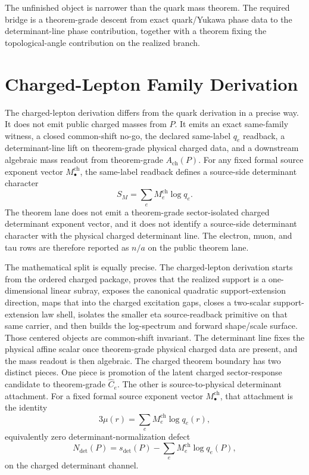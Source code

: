 \documentclass[11pt]{article}
\begin{document}
The unfinished object is narrower than the quark mass theorem. The required bridge is a
theorem-grade descent from exact quark/Yukawa phase data to the determinant-line phase
contribution, together with a theorem fixing the topological-angle contribution on the realized
branch.

\section{Charged-Lepton Family Derivation}

The charged-lepton derivation differs from the quark derivation in a precise way. It does not emit public charged masses from \(P\). It emits an exact same-family witness, a closed common-shift no-go, the declared same-label \(q_e\) readback, a determinant-line lift on theorem-grade physical charged data, and a downstream algebraic mass readout from theorem-grade \(A_{\mathrm{ch}}(P)\). For any fixed formal source exponent vector \(M_\bullet^{\mathrm{ch}}\), the same-label readback defines a source-side determinant character
\[
S_M=\sum_e M_e^{\mathrm{ch}}\log q_e.
\]
The theorem lane does not emit a theorem-grade sector-isolated charged determinant exponent vector, and it does not identify a source-side determinant character with the physical charged determinant line. The electron, muon, and tau rows are therefore reported as \(n/a\) on the public theorem lane.

The mathematical split is equally precise. The charged-lepton derivation starts from
the ordered charged package, proves that the realized support is a one-dimensional linear subray,
exposes the canonical quadratic support-extension direction, maps that into the charged
excitation gaps, closes a two-scalar support-extension law shell, isolates the smaller eta
source-readback primitive on that same carrier, and then builds the log-spectrum and forward
shape/scale surface. Those centered objects are common-shift invariant. The determinant line fixes the physical affine scalar once theorem-grade physical charged data are present, and the mass readout is then algebraic. The charged theorem boundary has two distinct pieces. One piece is promotion of the latent charged sector-response candidate to theorem-grade \(\widehat C_e\). The other is source-to-physical determinant attachment. For a fixed formal source exponent vector \(M_\bullet^{\mathrm{ch}}\), that attachment is the identity
\[
3\mu(r)=\sum_e M_e^{\mathrm{ch}}\log q_e(r),
\]
equivalently zero determinant-normalization defect
\[
N_{\det}(P)=s_{\det}(P)-\sum_e M_e^{\mathrm{ch}}\log q_e(P),
\]
on the charged determinant channel.
\end{document}
